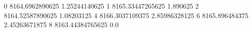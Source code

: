 0 8164.6962890625 1.25244140625
1 8165.33447265625 1.890625
2 8164.52587890625 1.08203125
4 8166.3037109375 2.85986328125
6 8165.896484375 2.45263671875
8 8163.44384765625 0.0

